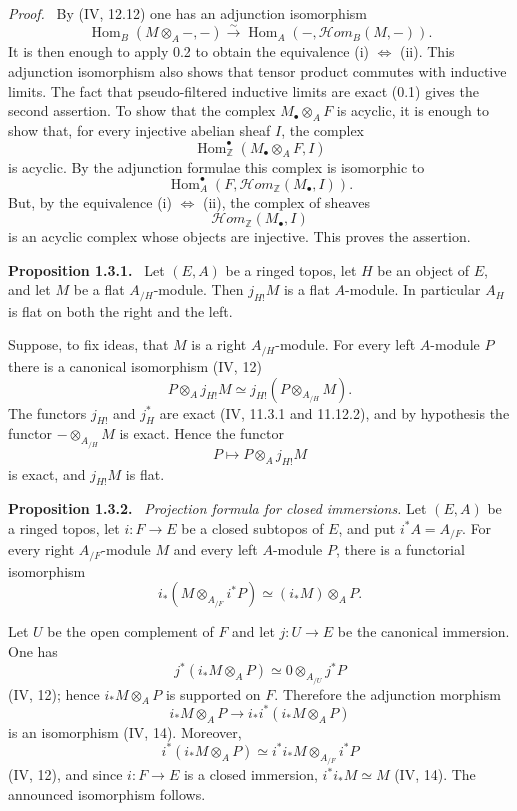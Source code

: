 \documentclass[11pt]{article}
\newcommand{\ZZ}{\mathbb Z}
\newcommand{\Hom}{\operatorname{Hom}}
\newcommand{\Hhom}{\mathcal{H}om}
\newenvironment{statement}[1]{\par\medskip\noindent\textbf{#1.}\ }{\par\medskip}
\newenvironment{prooftext}{\par\noindent\emph{Proof.}\ }{\par\medskip}
\begin{document}
\begin{prooftext}
By (IV, 12.12) one has an adjunction isomorphism
\[
\Hom_B(M\otimes_A -, -)\xrightarrow{\sim}
\Hom_A(-,\Hhom_B(M,-)).
\]
It is then enough to apply 0.2 to obtain the equivalence (i) $\Leftrightarrow$ (ii). This adjunction isomorphism also shows that tensor product commutes with inductive limits. The fact that pseudo-filtered inductive limits are exact (0.1) gives the second assertion. To show that the complex $M_\bullet\otimes_A F$ is acyclic, it is enough to show that, for every injective abelian sheaf $I$, the complex
\[
\Hom^\bullet_{\ZZ}(M_\bullet\otimes_A F,I)
\]
is acyclic. By the adjunction formulae this complex is isomorphic to
\[
\Hom^\bullet_A(F,\Hhom_{\ZZ}(M_\bullet,I)).
\]
But, by the equivalence (i) $\Leftrightarrow$ (ii), the complex of sheaves
\[
\Hhom_{\ZZ}(M_\bullet,I)
\]
is an acyclic complex whose objects are injective. This proves the assertion.
\end{prooftext}

\begin{statement}{Proposition 1.3.1}
Let $(E,A)$ be a ringed topos, let $H$ be an object of $E$, and let $M$ be a flat $A_{/H}$-module. Then $j_{H!}M$ is a flat $A$-module. In particular $A_H$ is flat on both the right and the left.
\end{statement}

Suppose, to fix ideas, that $M$ is a right $A_{/H}$-module. For every left $A$-module $P$ there is a canonical isomorphism (IV, 12)
\[
P\otimes_A j_{H!}M\simeq j_{H!}(P\otimes_{A_{/H}}M).
\]
The functors $j_{H!}$ and $j_H^*$ are exact (IV, 11.3.1 and 11.12.2), and by hypothesis the functor $-\otimes_{A_{/H}}M$ is exact. Hence the functor
\[
P\longmapsto P\otimes_A j_{H!}M
\]
is exact, and $j_{H!}M$ is flat.

\begin{statement}{Proposition 1.3.2}
\emph{Projection formula for closed immersions.} Let $(E,A)$ be a ringed topos, let $i:F\to E$ be a closed subtopos of $E$, and put $i^*A=A_{/F}$. For every right $A_{/F}$-module $M$ and every left $A$-module $P$, there is a functorial isomorphism
\[
i_*(M\otimes_{A_{/F}}i^*P)\simeq (i_*M)\otimes_A P .
\]
\end{statement}

Let $U$ be the open complement of $F$ and let $j:U\to E$ be the canonical immersion. One has
\[
j^*(i_*M\otimes_A P)\simeq 0\otimes_{A_{/U}}j^*P
\]
(IV, 12); hence $i_*M\otimes_A P$ is supported on $F$. Therefore the adjunction morphism
\[
i_*M\otimes_A P\longrightarrow i_*i^*(i_*M\otimes_A P)
\]
is an isomorphism (IV, 14). Moreover,
\[
i^*(i_*M\otimes_A P)\simeq i^*i_*M\otimes_{A_{/F}}i^*P
\]
(IV, 12), and since $i:F\to E$ is a closed immersion, $i^*i_*M\simeq M$ (IV, 14). The announced isomorphism follows.
\end{document}

